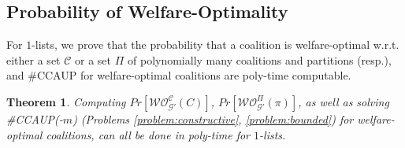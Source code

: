 \documentclass[letterpaper]{article}
\newtheorem{theorem}{Theorem}
\begin{document}
\subsection{Probability of Welfare-Optimality}
\label{sec:Probability of Optimality}
For $1$-lists, we prove that the probability that a coalition is welfare-optimal w.r.t. either a set $\mathcal{C}$ or a set $\Pi$ of polynomially many coalitions and partitions (resp.), %
and \#CCAUP for welfare-optimal coalitions are poly-time computable.
\begin{theorem}
\label{theorem:max-tractable}
Computing $Pr[\mathcal{WO}^{\mathcal{C}}_{\mathcal{G}'}(C)]$, $Pr[\mathcal{WO}_{\mathcal{G}'}^{\Pi}(\pi)]$, as well as solving \#CCAUP(-$m$) (Problems \ref{problem:constructive}, \ref{problem:bounded}) for welfare-optimal coalitions, can all be done in poly-time for $1$-lists.
\end{theorem}
\end{document}
